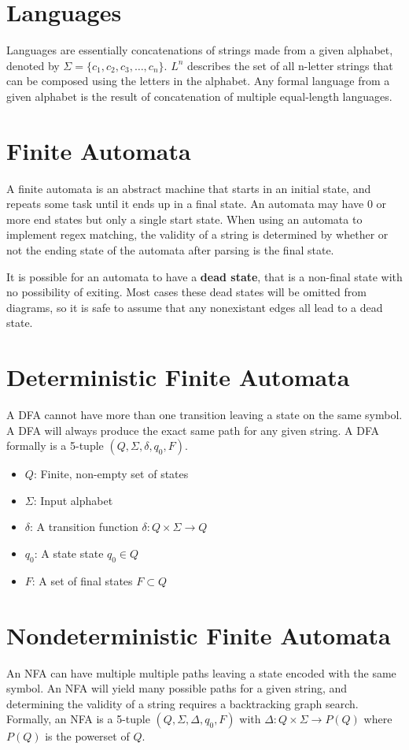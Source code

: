 \documentclass[11pt]{article}
\begin{document}
\section{Languages}
	Languages are essentially concatenations of strings made from a given alphabet, denoted by $\Sigma = \{c_1, c_2, c_3, \ldots ,c_n\}$. $L^n$ describes the set of all n-letter strings that can be composed using the letters in the alphabet. Any formal language from a given alphabet is the result of concatenation of multiple equal-length languages.
	
\section{Finite Automata}
	A finite automata is an abstract machine that starts in an initial state, and repeats some task until it ends up in a final state. An automata may have 0 or more end states but only a single start state. When using an automata to implement regex matching, the validity of a string is determined by whether or not the ending state of the automata after parsing is the final state.
	
	It is possible for an automata to have a \textbf{dead state}, that is a non-final state with no possibility of exiting. Most cases these dead states will be omitted from diagrams, so it is safe to assume that any nonexistant edges all lead to a dead state.
	
\section{Deterministic Finite Automata}
	A DFA cannot have more than one transition leaving a state on the same symbol. A DFA will always produce the exact same path for any given string. A DFA formally is a 5-tuple $(Q, \Sigma, \delta, q_0, F)$.
	\begin{itemize}
		\item $Q$: Finite, non-empty set of states
		\item $\Sigma$: Input alphabet
		\item $\delta$: A transition function $\delta : Q\times \Sigma \rightarrow Q$
		\item $q_0$: A state state $q_0 \in Q$
		\item $F$: A set of final states $F \subset Q$
	\end{itemize}
	
\section{Nondeterministic Finite Automata}
	An NFA can have multiple multiple paths leaving a state encoded with the same symbol. An NFA will yield many possible paths for a given string, and determining the validity of a string requires a backtracking graph search. Formally, an NFA is a 5-tuple $(Q, \Sigma, \Delta, q_0, F)$ with $\Delta : Q \times \Sigma \rightarrow P(Q)$ where $P(Q)$ is the powerset of $Q$.
	
\end{document}
